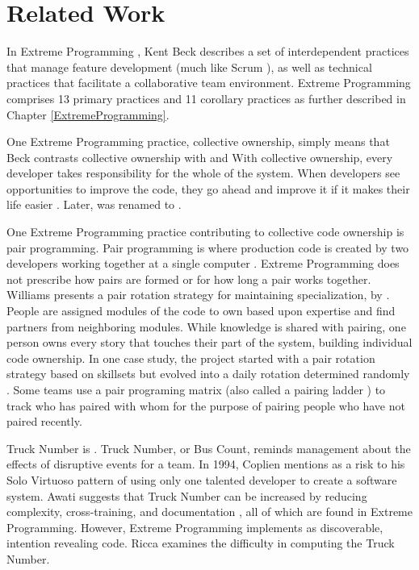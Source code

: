 \section{Related Work}
\label{SustainableSoftwareDevelopmentRelatedWork}
In Extreme Programming \cite{BeckExtremeProgramming2004}, Kent Beck describes a set of interdependent practices that manage feature development (much like Scrum \cite{SchwaberScrum}), as well as technical practices that facilitate a collaborative team environment. Extreme Programming comprises 13 primary practices and 11 corollary practices as further described in Chapter \ref{ExtremeProgramming}. 

One Extreme Programming practice, collective ownership, simply means that  Beck contrasts collective ownership with  and  With collective ownership, every developer takes responsibility for the whole of the system. When developers see opportunities to improve the code, they go ahead and improve it if it makes their life easier \cite{BeckExtremeProgramming1999}. Later,  was renamed to  \cite{BeckExtremeProgramming2004}. 

One Extreme Programming practice contributing to collective code ownership is pair programming. Pair programming is where production code is created by two developers working together at a single computer \cite{BeckExtremeProgramming2004}. Extreme Programming does not prescribe how pairs are formed or for how long a pair works together. Williams presents a pair rotation strategy for maintaining specialization, by   \cite{Williams2002}. People are assigned modules of the code to own based upon expertise and find partners from neighboring modules. While knowledge is shared with pairing, one person owns every story that touches their part of the system, building individual code ownership. In one case study, the project started with a pair rotation strategy based on skillsets but evolved into a daily rotation determined randomly \cite{Vanhanen2007}. Some teams use a pair programing matrix \cite{AlaverdyanPairProgrammingMatrix} (also called a pairing ladder \cite{Davies2009AgileCoaching}) to track who has paired with whom for the purpose of pairing people who have not paired recently.

Truck Number is  \cite{WikiTruckNumber}. Truck Number, or Bus Count, reminds management about the effects of disruptive events for a team. In 1994, Coplien \cite{Coplien1994} mentions  as a risk to his Solo Virtuoso pattern of using only one talented developer to create a software system. Awati suggests that Truck Number can be increased by reducing complexity, cross-training, and documentation \cite{AwatiBusFactor}, all of which are found in Extreme Programming. However, Extreme Programming implements  as discoverable, intention revealing code. Ricca \cite{Ricca2011TruckFactor} examines the difficulty in computing the Truck Number. 

